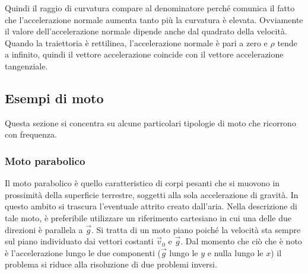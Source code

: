 Quindi il raggio di curvatura compare al denominatore perché comunica il fatto che l'accelerazione normale aumenta tanto più la curvatura è elevata. Ovviamente il valore dell'accelerazione normale dipende anche dal quadrato della velocità. Quando la traiettoria è rettilinea, l'accelerazione normale è pari a zero e $\rho$ tende a infinito, quindi il vettore accelerazione coincide con il vettore accelerazione tangenziale.

\subsection{Esempi di moto}

Questa sezione si concentra su alcune particolari tipologie di moto che ricorrono con frequenza.

\subsubsection{Moto parabolico}

Il moto parabolico è quello caratteristico di corpi pesanti che si muovono in prossimità della superficie terrestre, soggetti alla sola accelerazione di gravità. In questo ambito si trascura l'eventuale attrito creato dall'aria.
Nella descrizione di tale moto, è preferibile utilizzare un riferimento cartesiano in cui una delle due direzioni è parallela a $\vec{g}$. Si tratta di un moto piano poiché la velocità sta sempre sul piano individuato dai vettori costanti $\vec{v}_0$ e $\vec{g}$. Dal momento che ciò che è noto è l'accelerazione lungo le due componenti ($\vec{g}$ lungo le $y$ e nulla lungo le $x$) il problema si riduce alla risoluzione di due problemi inversi.

